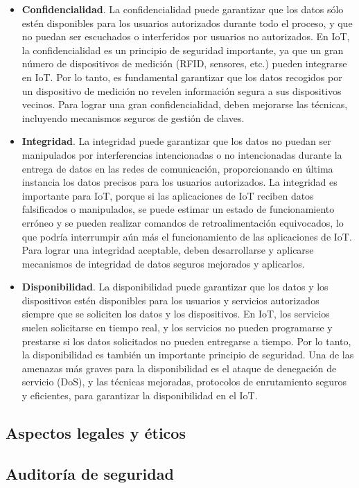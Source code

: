 {\begin{itemize}
    \item  \textbf{Confidencialidad}. La confidencialidad puede garantizar que los datos sólo estén disponibles para los usuarios autorizados durante todo el proceso, y que no puedan ser escuchados o interferidos por usuarios no autorizados. En IoT, la confidencialidad es un principio de seguridad importante, ya que un gran número de dispositivos de medición (RFID, sensores, etc.) pueden integrarse en IoT. Por lo tanto, es fundamental garantizar que los datos recogidos por un dispositivo de medición no revelen información segura a sus dispositivos vecinos. Para lograr una gran confidencialidad, deben mejorarse las técnicas, incluyendo mecanismos seguros de gestión de claves.
    \item  \textbf{Integridad}. La integridad puede garantizar que los datos no puedan ser manipulados por interferencias intencionadas o no intencionadas durante la entrega de datos en las redes de comunicación, proporcionando en última instancia los datos precisos para los usuarios autorizados. La integridad es importante para IoT, porque si las aplicaciones de IoT reciben datos falsificados o manipulados, se puede estimar un estado de funcionamiento erróneo y se pueden realizar comandos de retroalimentación equivocados, lo que podría interrumpir aún más el funcionamiento de las aplicaciones de IoT. Para lograr una integridad aceptable, deben desarrollarse y aplicarse mecanismos de integridad de datos seguros mejorados y aplicarlos.
    \item \textbf{Disponibilidad}. La disponibilidad puede garantizar que los datos y los dispositivos estén disponibles para los usuarios y servicios autorizados siempre que se soliciten los datos y los dispositivos. En IoT, los servicios suelen solicitarse en tiempo real, y los servicios no pueden programarse y prestarse si los datos solicitados no pueden entregarse a tiempo. Por lo tanto, la disponibilidad es también un importante principio de seguridad. Una de las amenazas más graves para la disponibilidad es el ataque de denegación de servicio (DoS), y las técnicas mejoradas, protocolos de enrutamiento seguros y eficientes, para garantizar la disponibilidad en el IoT.

\end{itemize}


\subsection{Aspectos legales y éticos}

\cite{smith2012internet}


\subsection{Auditoría de seguridad}



}